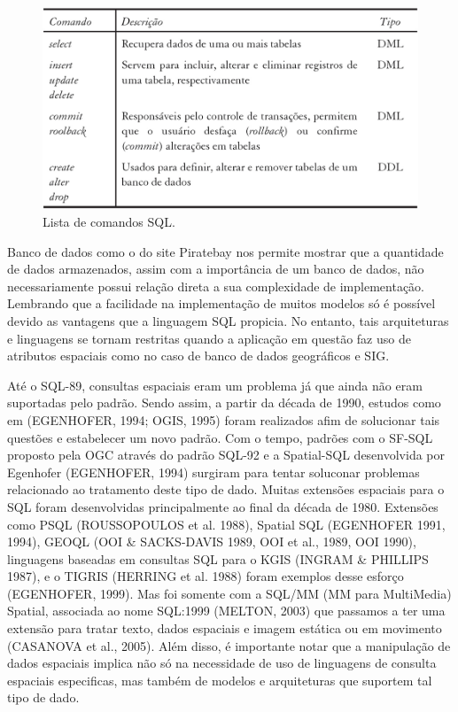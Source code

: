 		\begin{figure}
			\centering
			\includegraphics[width=1\linewidth]{data/comandos_sql}
			\caption{Lista de comandos SQL. \cite{CASANOVA_etal05}}
			\label{fig:comandossql}
		\end{figure}
		
		Banco de dados como o do site Piratebay nos permite mostrar que a quantidade de dados armazenados, assim com a importância de um banco de dados, não necessariamente possui relação direta a sua complexidade de implementação. Lembrando que a facilidade na implementação de muitos modelos só é possível devido as vantagens que a linguagem SQL propicia. No entanto, tais arquiteturas e linguagens se tornam restritas quando a aplicação em questão faz uso de atributos espaciais como no caso de banco de dados geográficos e SIG.
		
		Até o SQL-89, consultas espaciais eram um problema já que ainda não eram suportadas pelo padrão. Sendo assim, a partir da década de 1990, estudos como em (EGENHOFER, 1994\cite{EGENHOFER_92}; OGIS, 1995\cite{OGIS}) foram realizados afim de solucionar tais questões e estabelecer um novo padrão. Com o tempo, padrões com o SF-SQL proposto pela OGC através do padrão SQL-92 e a Spatial-SQL desenvolvida por Egenhofer (EGENHOFER, 1994)\cite{EGENHOFER_92} surgiram para tentar soluconar problemas relacionado ao tratamento deste tipo de dado. Muitas extensões espaciais para o SQL foram desenvolvidas principalmente ao final da década de 1980. Extensões como PSQL (ROUSSOPOULOS et al. 1988)\cite{ROUSSOPOULOS_etal88}, Spatial SQL (EGENHOFER 1991\cite{EGENHOFER_91}, 1994\cite{EGENHOFER_92}), GEOQL (OOI \& SACKS-DAVIS 1989\cite{OOI_SAKIS_DAVIS}, OOI et al., 1989\cite{OOI_etal89}, OOI 1990\cite{OOI}), linguagens baseadas em consultas SQL para o KGIS (INGRAM \& PHILLIPS 1987)\cite{INGRAM_PHILLIPS}, e o TIGRIS (HERRING et al. 1988)\cite{HERRING_etal88} foram exemplos desse esforço (EGENHOFER, 1999)\cite{EGENHOFER_etal99}. Mas foi somente com a SQL/MM (MM para MultiMedia) Spatial, associada ao nome SQL:1999 (MELTON, 2003)\cite{MELTON} que passamos a ter uma extensão para tratar texto, dados espaciais e imagem estática ou em movimento (CASANOVA et al., 2005)\cite{CASANOVA_etal05}. Além disso, é importante notar que a manipulação de dados espaciais implica não só na necessidade de uso de linguagens de consulta espaciais especificas, mas também de modelos e arquiteturas que suportem tal tipo de dado.
		
